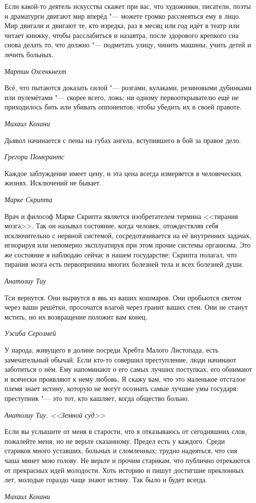\documentclass[a4paper,10pt]{book}
\begin{document}
\epigraph{Если какой-то деятель искусства скажет при вас, что художники, писатели, поэты и драматурги двигают мир вперёд "--- можете громко рассмеяться ему в лицо.
Мир двигали и двигают те, кто изредка, раз в месяц или год идёт в театр или читает книжку, чтобы расслабиться и назавтра, после здорового крепкого сна снова делать то, что должно "--- подметать улицу, чинить машины, учить детей и лечить больных.}
{\textit{Мартин Охсенкнехт}}

\epigraph{Всё, что пытаются доказать силой "--- розгами, кулаками, резиновыми дубинками или пулемётами "--- скорее всего, ложь;
ни одному первооткрывателю ещё не приходилось бить или убивать оппонентов, чтобы убедить их в своей правоте.}
{\textit{Михаил Кохани}}

\epigraph{Дьявол начинается с пены на губах ангела, вступившего в бой за правое дело.}
{\textit{Грегори Померантс}}

\epigraph{Каждое заблуждение имеет цену, и эта цена всегда измеряется в человеческих жизнях.
Исключений не бывает.}
{\textit{Марке Скрипта}}

\epigraph{Врач и философ Марке Скрипта является изобретателем термина <<тирания мозга>>.
Так он называл состояние, когда человек, отождествляя себя исключительно с нервной системой, сосредотачивается на её внутренних задачах, игнорируя или непомерно эксплуатируя при этом прочие системы организма.
Это же состояние я наблюдаю сейчас в нашем государстве;
Скрипта полагал, что тирания мозга есть первопричина многих болезней тела и всех болезней души.}
{\textit{Анатолиу Тиу}}
 
\epigraph{Тси вернутся.
Они вырвутся в явь из ваших кошмаров.
Они пробьются светом через ваши решётки, просочатся влагой через гранит ваших стен.
Они не станут мстить, но их возвращение положит вам конец.}
{\textit{Уэсиба Серозмей}}

\epigraph{У народа, живущего в долине посреди Хребта Малого Листопада, есть замечательный обычай.
Если кто-то совершил преступление, люди начинают заботиться о нём.
Ему напоминают о его самых лучших поступках, его обнимают и всячески проявляют к нему любовь.
Я скажу вам, что это маленькое отсталое племя знает истину, которую не могут осознать самые лучшие умы государя: преступник "--- это тот, кто кашляет, когда общество больно.}
{\textit{Анатолиу Тиу. <<Земной суд>>}}

\epigraph{Если вы услышите от меня в старости, что я отказываюсь от сегодняшних слов, пожалейте меня, но не верьте сказанному.
Предел есть у каждого.
Среди стариков много уставших, больных и сломленных;
трудно надеяться, что сия чаша минет мою голову.
Не верьте и прочим старикам, что публично отрекаются от прекрасных идей молодости.
Хоть историю и пишут достигшие преклонных лет, молодые гораздо чаще знают истину.
Так было и будет всегда.}
{\textit{Михаил Кохани}}
\end{document}
